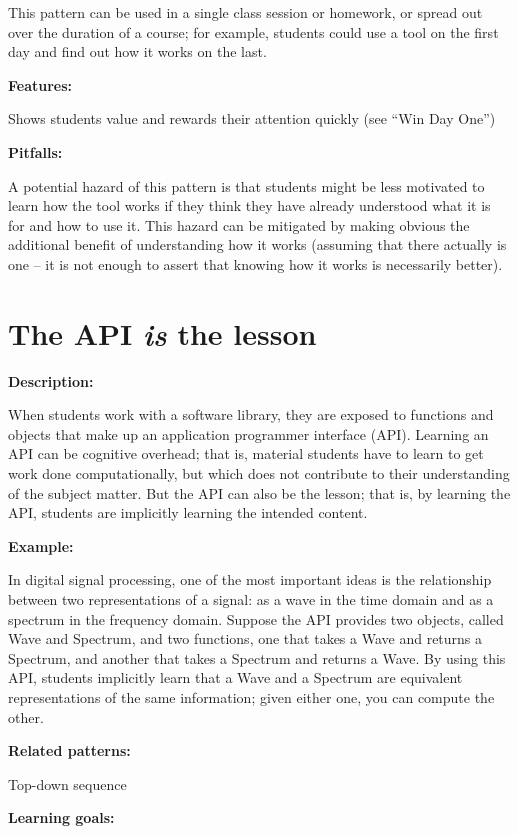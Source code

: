 \documentclass[]{book}
\begin{document}
This pattern can be used in a single class session or homework, or
spread out over the duration of a course; for example, students could
use a tool on the first day and find out how it works on the last.

\textbf{Features:}

Shows students value and rewards their attention quickly (see ``Win Day
One'')

\textbf{Pitfalls:}

A potential hazard of this pattern is that students might be less
motivated to learn how the tool works if they think they have already
understood what it is for and how to use it. This hazard can be
mitigated by making obvious the additional benefit of understanding how
it works (assuming that there actually is one -- it is not enough to
assert that knowing how it works is necessarily better).

\section{\texorpdfstring{The API \emph{is} the
lesson}{The API is the lesson}}\label{the-api-is-the-lesson}

\textbf{Description:}

When students work with a software library, they are exposed to
functions and objects that make up an application programmer interface
(API). Learning an API can be cognitive overhead; that is, material
students have to learn to get work done computationally, but which does
not contribute to their understanding of the subject matter. But the API
can also be the lesson; that is, by learning the API, students are
implicitly learning the intended content.

\textbf{Example:}

In digital signal processing, one of the most important ideas is the
relationship between two representations of a signal: as a wave in the
time domain and as a spectrum in the frequency domain. Suppose the API
provides two objects, called Wave and Spectrum, and two functions, one
that takes a Wave and returns a Spectrum, and another that takes a
Spectrum and returns a Wave. By using this API, students implicitly
learn that a Wave and a Spectrum are equivalent representations of the
same information; given either one, you can compute the other.

\textbf{Related patterns:}

Top-down sequence

\textbf{Learning goals:}
\end{document}

